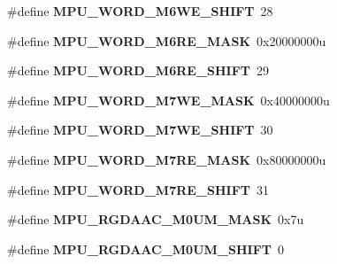\begin{DoxyCompactItemize}
\item 
\#define {\bfseries M\+P\+U\+\_\+\+W\+O\+R\+D\+\_\+\+M6\+W\+E\+\_\+\+S\+H\+I\+FT}~28\hypertarget{group__MPU__Register__Masks_ga1cd57764e1dc69513f0bb0bb63c7ca44}{}\label{group__MPU__Register__Masks_ga1cd57764e1dc69513f0bb0bb63c7ca44}

\item 
\#define {\bfseries M\+P\+U\+\_\+\+W\+O\+R\+D\+\_\+\+M6\+R\+E\+\_\+\+M\+A\+SK}~0x20000000u\hypertarget{group__MPU__Register__Masks_gaea71b8ad714cf0bc8e007cca8a9a6fd4}{}\label{group__MPU__Register__Masks_gaea71b8ad714cf0bc8e007cca8a9a6fd4}

\item 
\#define {\bfseries M\+P\+U\+\_\+\+W\+O\+R\+D\+\_\+\+M6\+R\+E\+\_\+\+S\+H\+I\+FT}~29\hypertarget{group__MPU__Register__Masks_ga302e27597edfb853b8d08552c27d4a17}{}\label{group__MPU__Register__Masks_ga302e27597edfb853b8d08552c27d4a17}

\item 
\#define {\bfseries M\+P\+U\+\_\+\+W\+O\+R\+D\+\_\+\+M7\+W\+E\+\_\+\+M\+A\+SK}~0x40000000u\hypertarget{group__MPU__Register__Masks_gab63d3094e6173e76e2df25ce9faca8a0}{}\label{group__MPU__Register__Masks_gab63d3094e6173e76e2df25ce9faca8a0}

\item 
\#define {\bfseries M\+P\+U\+\_\+\+W\+O\+R\+D\+\_\+\+M7\+W\+E\+\_\+\+S\+H\+I\+FT}~30\hypertarget{group__MPU__Register__Masks_ga38c58ef487241b3084e6df9b7d6e316e}{}\label{group__MPU__Register__Masks_ga38c58ef487241b3084e6df9b7d6e316e}

\item 
\#define {\bfseries M\+P\+U\+\_\+\+W\+O\+R\+D\+\_\+\+M7\+R\+E\+\_\+\+M\+A\+SK}~0x80000000u\hypertarget{group__MPU__Register__Masks_gad6a0ce43c3940a0870853a8601402248}{}\label{group__MPU__Register__Masks_gad6a0ce43c3940a0870853a8601402248}

\item 
\#define {\bfseries M\+P\+U\+\_\+\+W\+O\+R\+D\+\_\+\+M7\+R\+E\+\_\+\+S\+H\+I\+FT}~31\hypertarget{group__MPU__Register__Masks_gab8b7a9573658248eaba1a55f660f8ca1}{}\label{group__MPU__Register__Masks_gab8b7a9573658248eaba1a55f660f8ca1}

\item 
\#define {\bfseries M\+P\+U\+\_\+\+R\+G\+D\+A\+A\+C\+\_\+\+M0\+U\+M\+\_\+\+M\+A\+SK}~0x7u\hypertarget{group__MPU__Register__Masks_gaa4855af22b69592db90ae0eef06608fc}{}\label{group__MPU__Register__Masks_gaa4855af22b69592db90ae0eef06608fc}

\item 
\#define {\bfseries M\+P\+U\+\_\+\+R\+G\+D\+A\+A\+C\+\_\+\+M0\+U\+M\+\_\+\+S\+H\+I\+FT}~0\hypertarget{group__MPU__Register__Masks_ga3ba290e2151d652e653e23a97738b1e5}{}\label{group__MPU__Register__Masks_ga3ba290e2151d652e653e23a97738b1e5}


\end{DoxyCompactItemize}
